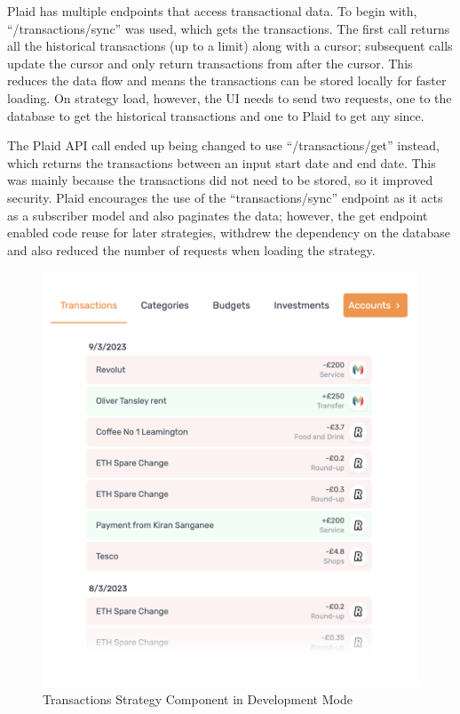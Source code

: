 Plaid has multiple endpoints that access transactional data. To begin with, ``/transactions/sync'' was used, which gets the transactions. The first call returns all the historical transactions (up to a limit) along with a cursor; subsequent calls update the cursor and only return transactions from after the cursor. This reduces the data flow and means the transactions can be stored locally for faster loading. On strategy load, however, the UI needs to send two requests, one to the database to get the historical transactions and one to Plaid to get any since.

The Plaid API call ended up being changed to use ``/transactions/get'' instead, which returns the transactions between an input start date and end date. This was mainly because the transactions did not need to be stored, so it improved security. Plaid encourages the use of the ``transactions/sync'' endpoint as it acts as a subscriber model and also paginates the data; however, the get endpoint enabled code reuse for later strategies, withdrew the dependency on the database and also reduced the number of requests when loading the strategy.

\begin{figure}[H]
	\centering
	\includegraphics[width=\textwidth]{images/transactions_development.png}
	\caption{Transactions Strategy Component in Development Mode}
	\label{fig:TransactionsStrategy}
\end{figure}

